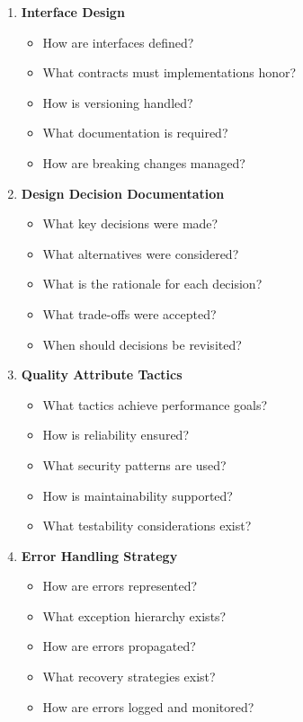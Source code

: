 \documentclass[11pt,letterpaper]{article}
\begin{document}
\begin{enumerate}[label=\textbf{C\arabic*:}, leftmargin=2.5em]
    \item \textbf{Interface Design}
    \begin{itemize}[nosep]
        \item How are interfaces defined?
        \item What contracts must implementations honor?
        \item How is versioning handled?
        \item What documentation is required?
        \item How are breaking changes managed?
    \end{itemize}
    
    \item \textbf{Design Decision Documentation}
    \begin{itemize}[nosep]
        \item What key decisions were made?
        \item What alternatives were considered?
        \item What is the rationale for each decision?
        \item What trade-offs were accepted?
        \item When should decisions be revisited?
    \end{itemize}
    
    \item \textbf{Quality Attribute Tactics}
    \begin{itemize}[nosep]
        \item What tactics achieve performance goals?
        \item How is reliability ensured?
        \item What security patterns are used?
        \item How is maintainability supported?
        \item What testability considerations exist?
    \end{itemize}
    
    \item \textbf{Error Handling Strategy}
    \begin{itemize}[nosep]
        \item How are errors represented?
        \item What exception hierarchy exists?
        \item How are errors propagated?
        \item What recovery strategies exist?
        \item How are errors logged and monitored?
    \end{itemize}
    

\end{enumerate}
\end{document}
